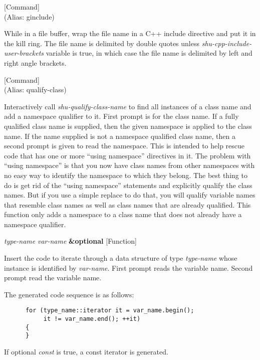 \vspace{1em}
\noindent
{}
\usebox{\funcname}
 \hfill [Command]\\%
 (Alias: ginclude)

\begin{doc-string}
While in a file buffer, wrap the file name in a C++ include directive and
put it in the kill ring.  The file name is delimited by double quotes unless
\emph{shu-cpp-include-user-brackets} variable is true, in which case the file name
is delimited by left and right angle brackets.
\end{doc-string}

\vspace{1em}
\noindent
{}
\usebox{\funcname}
 \hfill [Command]\\%
 (Alias: qualify-class)

\begin{doc-string}
Interactively call \emph{shu-qualify-class-name} to find all instances of a class name and
add a namespace qualifier to it.  First prompt is for the class name.  If a fully qualified
class name is supplied, then the given namespace is applied to the class name.  If the name
supplied is not a namespace qualified class name, then a second prompt is given to read the
namespace.
This is intended to help rescue code that has one or more ``using namespace''
directives in it.  The problem with ``using namespace'' is that you now have
class names from other namespaces with no easy way to identify the namespace
to which they belong.  The best thing to do is get rid of the ``using
namespace'' statements and explicitly qualify the class names.  But if you
use a simple replace to do that, you will qualify variable names that resemble
class names as well as class names that are already qualified.  This function
only adds a namespace to a class name that does not already have a namespace
qualifier.
\end{doc-string}

\vspace{1em}
\noindent
{}
\usebox{\funcname}\emph{type-name} \emph{var-name} \textbf{\&optional}
 \hfill [Function]
\hspace*{\wd\funcname}

\begin{doc-string}
Insert the code to iterate through a data structure of type \emph{type-name} whose
instance is identified by \emph{var-name}.  First prompt reads the variable name.
Second prompt read the variable name.

The generated code sequence is as follows:

\small{\begin{verbatim}
      for (type_name::iterator it = var_name.begin();
           it != var_name.end(); ++it)
      {
      }
\end{verbatim}}

If optional \emph{const} is true, a const iterator is generated.
\end{doc-string}

